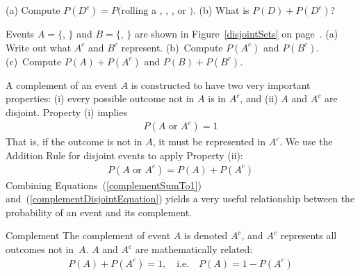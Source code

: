 \begin{exercisewrap}
\begin{nexercise}
(a) Compute $P(D^c) = P($rolling a , , , or $)$. (b) What is $P(D) + P(D^c)$?\footnotemark
\end{nexercise}
\end{exercisewrap}

\begin{exercisewrap}
\begin{nexercise}
Events $A=\{$, $\}$ and $B=\{$, $\}$ are shown in Figure~\ref{disjointSets} on page~\pageref{disjointSets}. (a) Write out what $A^c$ and $B^c$ represent. (b)~Compute $P(A^c)$ and $P(B^c)$. (c)~Compute $P(A)+P(A^c)$ and $P(B)+P(B^c)$.\footnotemark
\end{nexercise}
\end{exercisewrap}

A complement of an event $A$ is constructed to have two very important properties: (i) every possible outcome not in $A$ is in $A^c$, and (ii) $A$ and $A^c$ are disjoint. Property (i) implies
\begin{eqnarray}
P(A\text{ or }A^c) = 1
\label{complementSumTo1}
\end{eqnarray}
That is, if the outcome is not in $A$, it must be represented in $A^c$. We use the Addition Rule for disjoint events to apply Property (ii):
\begin{eqnarray}
P(A\text{ or }A^c) = P(A) + P(A^c)
\label{complementDisjointEquation}
\end{eqnarray}
Combining Equations~(\ref{complementSumTo1}) and~(\ref{complementDisjointEquation}) yields a very useful relationship between the probability of an event and its complement.

\begin{onebox}{Complement}
The complement of event $A$ is denoted $A^c$, and $A^c$ represents all outcomes not in~$A$. $A$ and $A^c$ are mathematically related: \vspace{-2mm}
\begin{eqnarray}\label{complement}
P(A) + P(A^c) = 1, \quad\text{i.e.}\quad P(A) = 1-P(A^c)
\end{eqnarray}\vspace{-6.5mm}
\end{onebox}

